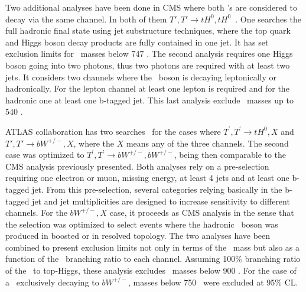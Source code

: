 Two additional analyses have been done in CMS where both \Tp's are considered to decay via the same channel. In both of them ${T',T'\rightarrow tH^{0},tH^{0}}$~\cite{Khachatryan:2015axa,CMS-PAS-B2G-14-003}. One searches the full hadronic final state using jet substructure techniques, where the top quark and Higgs boson decay products are fully contained in one jet. It has set exclusion limits for \Tp~masses below 747 \GeVcc. The second analysis requires one Higgs boson going into two photons, thus two photons are required with at least two jets. It considers two channels where the \W~boson is decaying leptonically or hadronically. For the lepton channel at least one lepton is required and for the hadronic one at least one b-tagged jet. This last analysis exclude \Tp~masses up to 540 \GeVcc.
%

ATLAS collaboration has two searches~\cite{ATLAS-CONF-2015-012} for the cases where ${T^{'},T^{'}\rightarrow tH^{0},X}$ and ${T',T'\rightarrow bW^{+/-},X}$, where the $X$ means any of the three channels. The second case was optimized to $T^{'},T^{'}\rightarrow bW^{+/-},bW^{+/-}$, being then comparable to the CMS analysis previously presented. Both analyses rely on a pre-selection requiring one electron or muon, missing energy, at least 4 jets and at least one b-tagged jet. From this pre-selection, several categories relying basically in the b-tagged jet and jet multiplicities are designed to increase sensitivity to different channels. For the ${bW^{+/-},X}$ case, it proceeds as CMS analysis in the sense that the selection was optimized to select events where the hadronic \W~boson was produced in boosted or in resolved topology. The two analyses have been combined to present exclusion limits not only in terms of the \Tp~mass but also as a function of the \Tp~branching ratio to each channel. Assuming 100\% branching ratio of the \Tp~to top-Higgs, these analysis excludes \Tp~masses below 900 \GeVcc. For the case of a \Tp~exclusively decaying to $bW^{+/-}$, masses below 750 \GeVcc~were excluded at 95\% CL.

